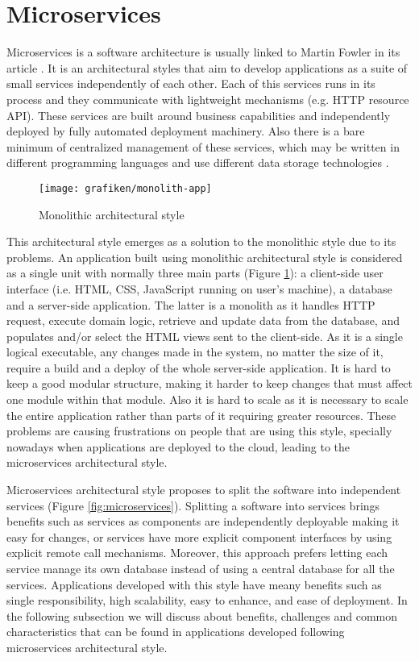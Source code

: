 \section{Microservices}
Microservices is a software architecture is usually linked to Martin Fowler in its article \cite{Fowler2014}. It is an architectural styles that aim to develop applications as a suite of small services independently of each other. Each of this services runs in its process and they communicate with lightweight mechanisms (e.g. HTTP resource API). These services are built around business capabilities and independently deployed by fully automated deployment machinery. Also there is a bare minimum of centralized management of these services, which may be written in different programming languages and use different data storage technologies \cite{Fowler2014}.

\begin{figure}[htb]
	\centering
    \texttt{[image: grafiken/monolith-app]}
    \caption{Monolithic architectural style}
    \label{fig:monolith}
\end{figure}

This architectural style emerges as a solution to the monolithic style due to its problems. An application built using monolithic architectural style is considered as a single unit with normally three main parts (Figure \ref{fig:monolith}): a client-side user interface (i.e. HTML, CSS, JavaScript running on user's machine), a database and a server-side application. The latter is a monolith as it handles HTTP request, execute domain logic, retrieve and update data from the database, and populates and/or select the HTML views sent to the client-side. As it is a single logical executable, any changes made in the system, no matter the size of it, require a build and a deploy of the whole server-side application. It is hard to keep a good modular structure, making it harder to keep changes that must affect one module within that module. Also it is hard to scale as it is necessary to scale the entire application rather than parts of it requiring greater resources. These problems are causing frustrations on people that are using this style, specially nowadays when applications are deployed to the cloud, leading to the microservices architectural style.

Microservices architectural style proposes to split the software into independent services (Figure \ref{fig:microservices}). Splitting a software into services brings benefits such as services as components are independently deployable making it easy for changes, or services have more explicit component interfaces by using explicit remote call mechanisms. Moreover, this approach prefers letting each service manage its own database instead of using a central database for all the services. Applications developed with this style have meany benefits such as single responsibility, high scalability, easy to enhance, and ease of deployment. In the following subsection we will discuss about benefits, challenges and common characteristics that can be found in applications developed following microservices architectural style.

